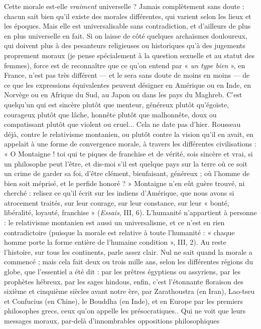 Cette morale est-elle {\it vraiment} universelle ? Jamais complètement sans
doute : chacun sait bien qu’il existe des morales différentes, qui varient selon les
lieux et les époques. Mais elle est universalisable sans contradiction, et d’ailleurs
de plus en plus universelle en fait. Si on laisse de côté quelques archaïsmes douloureux,
qui doivent plus à des pesanteurs religieuses ou historiques qu’à des
jugements proprement moraux (je pense spécialement à la question sexuelle et
au statut des femmes), force est de reconnaître que ce qu’on entend par « {\it un
type bien} », en France, n’est pas très différent — et le sera sans doute de moins
en moins — de ce que les expressions équivalentes peuvent désigner en Amérique
ou en Inde, en Norvège ou en Afrique du Sud, au Japon ou dans les pays
du Maghreb. C’est quelqu'un qui est sincère plutôt que menteur, généreux
plutôt qu'égoïste, courageux plutôt que lâche, honnête plutôt que malhonnête,
doux ou compatissant plutôt que violent ou cruel... Cela ne date pas d’hier.
Rousseau déjà, contre le relativisme montanien, ou plutôt contre la vision qu'il
en avait, en appelait à une forme de convergence morale, à travers les différentes
civilisations : « O Montaigne ! toi qui te piques de franchise et de vérité,
sois sincère et vrai, si un philosophe peut l’être, et dis-moi s’il est quelque pays
sur la terre où ce soit un crime de garder sa foi, d’être clément, bienfaisant,
généreux ; où l’homme de bien soit méprisé, et le perfide honoré ? » Montaigne
n’en eût guère trouvé, ni cherché : relisez ce qu’il écrit sur les indiens d'Amérique,
que nous avons si atrocement traités, sur leur courage, sur leur constance, sur
leur « bonté, libéralité, loyauté, franchise » ({\it Essais}, III, 6). L’humanité n’appartient
à personne : le relativisme montanien est aussi un universalisme, et ce
n’est en rien contradictoire (puisque la morale est relative à toute l'humanité :
« chaque homme porte la forme entière de l’humaine condition », III, 2). Au
reste l’histoire, sur tous les continents, parle assez clair. Nul ne sait quand la
morale a commencé ; mais cela fait deux ou trois mille ans, selon les différentes
régions du globe, que l'essentiel a été dit : par les prêtres égyptiens ou assyriens,
par les prophètes hébreux, par les sages hindous, enfin, c’est l’étonnante floraison
des sixième et cinquième siècles avant notre ère, par Zarathoustra (en
Iran), Lao-tseu et Confucius (en Chine), le Bouddha (en Inde), et en Europe
par les premiers philosophes grecs, ceux qu’on appelle les présocratiques.. Qui
ne voit que leurs messages moraux, par-delà d'innombrables oppositions philosophiques
